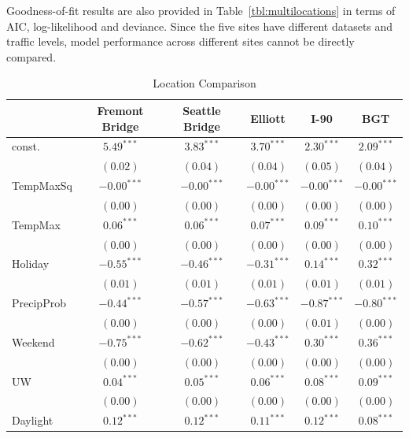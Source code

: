 \documentclass [11pt, proquest] {uwthesis}[2015/03/03]
\begin{document}
Goodness-of-fit results are also provided in Table~\ref{tbl:multilocations} in terms of AIC, log-likelihood and deviance. Since the five sites have different datasets and traffic levels, model performance across different sites cannot be directly compared. 


\begin{table}
\caption{Location Comparison}
\begin{center}
\begin{tabular}{l c c c c c }
\hline
 & Fremont Bridge & Seattle Bridge & Elliott & I-90 & BGT \\
\hline
const.         & $5.49^{***}$  & $3.83^{***}$  & $3.70^{***}$  & $2.30^{***}$  & $2.09^{***}$  \\
               & $(0.02)$      & $(0.04)$      & $(0.04)$      & $(0.05)$      & $(0.04)$      \\
TempMaxSq      & $-0.00^{***}$ & $-0.00^{***}$ & $-0.00^{***}$ & $-0.00^{***}$ & $-0.00^{***}$ \\
               & $(0.00)$      & $(0.00)$      & $(0.00)$      & $(0.00)$      & $(0.00)$      \\
TempMax        & $0.06^{***}$  & $0.06^{***}$  & $0.07^{***}$  & $0.09^{***}$  & $0.10^{***}$  \\
               & $(0.00)$      & $(0.00)$      & $(0.00)$      & $(0.00)$      & $(0.00)$      \\
Holiday        & $-0.55^{***}$ & $-0.46^{***}$ & $-0.31^{***}$ & $0.14^{***}$  & $0.32^{***}$  \\
               & $(0.01)$      & $(0.01)$      & $(0.01)$      & $(0.01)$      & $(0.01)$      \\
PrecipProb     & $-0.44^{***}$ & $-0.57^{***}$ & $-0.63^{***}$ & $-0.87^{***}$ & $-0.80^{***}$ \\
               & $(0.00)$      & $(0.00)$      & $(0.00)$      & $(0.01)$      & $(0.00)$      \\
Weekend        & $-0.75^{***}$ & $-0.62^{***}$ & $-0.43^{***}$ & $0.30^{***}$  & $0.36^{***}$  \\
               & $(0.00)$      & $(0.00)$      & $(0.00)$      & $(0.00)$      & $(0.00)$      \\
UW             & $0.04^{***}$  & $0.05^{***}$  & $0.06^{***}$  & $0.08^{***}$  & $0.09^{***}$  \\
               & $(0.00)$      & $(0.00)$      & $(0.00)$      & $(0.00)$      & $(0.00)$      \\
Daylight       & $0.12^{***}$  & $0.12^{***}$  & $0.11^{***}$  & $0.12^{***}$  & $0.08^{***}$  \\

\end{tabular}
\end{center}
\end{table}
\end{document}
